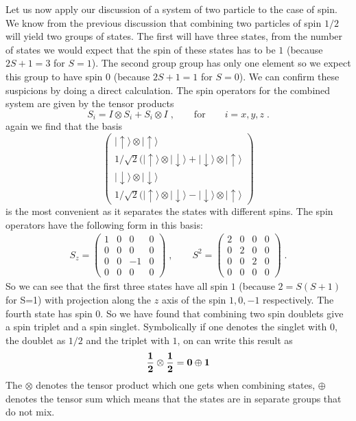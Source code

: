 \documentclass[12pt]{article}
\begin{document}
            Let us now apply our discussion of a system of two particle to the case of spin. We know from the previous discussion that combining two particles of spin $1/2$ will yield two groups of states. The first will have three states, from the number of states we would expect that the spin of these states has to be $1$ (because $2S+1=3$ for $S=1$). The second group group has only one element so we expect this group to have spin $0$ (because $2S+1=1$ for $S=0$). We can confirm these suspicions by doing a direct calculation. The spin operators for the combined system are given by the tensor products
            \[S_i=I\otimes S_i + S_i\otimes I\;,\qquad\mbox{for}\qquad i=x,y,z\;.\]
again we find that the basis
            \[\left(\begin{array}{c}
              |\uparrow\rangle\otimes|\uparrow\rangle\\
            1/\sqrt{2}(|\uparrow\rangle\otimes|\downarrow\rangle+|\downarrow\rangle\otimes|\uparrow\rangle\\
            |\downarrow\rangle\otimes|\downarrow\rangle\\
            1/\sqrt{2}(|\uparrow\rangle\otimes|\downarrow\rangle-|\downarrow\rangle\otimes|\uparrow\rangle\end{array}\right)\]
is the most convenient as it separates the states with different spins. The spin operators have the following form in this basis: 
\begin{eqnarray}  
  S_z=\left(\begin{array}{cccc}
    1&0&0&0\\
    0&0&0&0\\
    0&0&-1&0\\
    0&0&0&0
  \end{array}\right)\;,\qquad
  S^2=\left(\begin{array}{cccc}
    2&0&0&0\\
    0&2&0&0\\
    0&0&2&0\\
    0&0&0&0
  \end{array}\right)\;.
\end{eqnarray}            
  So we can see that the first three states have all spin $1$ (because $2=S(S+1)$ for S=1) with projection along the $z$ axis of the spin $1,0,-1$ respectively. The fourth state has spin $0$. So we have found that combining two spin doublets give a spin triplet and a spin singlet. Symbolically if one denotes the singlet with $0$, the doublet as $1/2$ and the triplet with $1$, on can write this result as
  \[{\bf \frac{1}{2}}\otimes{\bf \frac{1}{2}}={\bf 0}\oplus {\bf1}\]
  The $\otimes$ denotes the tensor product which one gets when combining states, $\oplus$ denotes the tensor sum which means that the states are in separate groups that do not mix.
\end{document}
